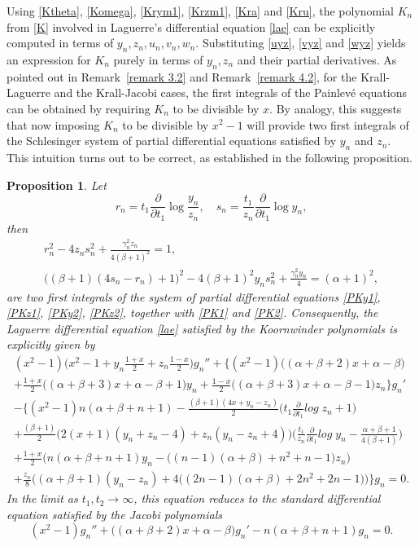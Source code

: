 \documentclass[10pt, reqno]{amsart}
\numberwithin{equation}{section}
\newtheorem{proposition}{Proposition}[section]
\numberwithin{equation}{section}
\begin{document}
Using \eqref{Ktheta}, \eqref{Komega}, \eqref{Krym1}, \eqref{Krzm1}, \eqref{Kra} and \eqref{Kru}, the polynomial $K_n$ from \eqref{K} involved in Laguerre's differential equation \eqref{lae} can be explicitly computed in terms of $y_n,z_n,u_n,v_n,w_n$. Substituting \eqref{uyz}, \eqref{vyz} and \eqref{wyz} yields an expression for $K_n$ purely in terms of  $y_n, z_n$ and their partial derivatives. As pointed out in Remark~\ref{remark 3.2} and Remark~\ref{remark 4.2}, for the Krall-Laguerre and the Krall-Jacobi cases, the first integrals of the Painlevé equations can be obtained by requiring  $K_n$ to be divisible by $x$. By analogy, this suggests that now imposing $K_n$ to be divisible by $x^2-1$ will provide two first integrals of the  Schlesinger system of partial differential equations satisfied by $y_n$ and $z_n$. This intuition turns out to be correct, as established in the following proposition.
\begin{proposition} \label{proposition 5.1}
Let
\begin{equation} 
r_n=t_1\frac{\partial}{\partial t_1} \log\frac{y_n}{z_n},\quad s_n=\frac{t_1}{z_n}\frac{\partial}{\partial t_1}\log y_n,\label{rs}
\end{equation}
then
\begin{gather}
r_n^2-4z_ns_n^2+\frac{\gamma_n^2z_n}{4(\beta+1)^2}=1,\label{SKFI1}\\
\big((\beta+1)(4s_n-r_n)+1\big)^2-4(\beta+1)^2y_ns_n^2+\frac{\gamma_n^2 y_n}{4}=(\alpha+1)^2,\label{SKFI2}
\end{gather} 
are two first integrals of the system of partial differential equations \eqref{PKy1}, \eqref{PKz1}, \eqref{PKy2}, \eqref{PKz2}, together with \eqref{PK1} and \eqref{PK2}. Consequently, the Laguerre differential equation \eqref{lae} satisfied by the Koornwinder polynomials is explicitly given by
\begin{multline}
(x^2-1)\Big(x^2-1+y_n\frac{1+x}{2}+z_n\frac{1-x}{2}\Big)g_n''+\Big\{(x^2-1)\big((\alpha+\beta+2)x+\alpha-\beta\big)\\
+\frac{1+x}{2}\big((\alpha+\beta+3)x+\alpha-\beta+1\big)y_n+\frac{1-x}{2}\big((\alpha+\beta+3)x+\alpha-\beta-1\big)z_n\Big\}g_n'\\
-\Bigg\{(x^2-1)n(\alpha+\beta+n+1)-\frac{(\beta+1)(4x+y_n-z_n)}{2}\Big(t_1\frac{\partial}{\partial t_1} log\;z_n+1\Big)\\
+\frac{(\beta+1)}{2}\Big(2(x+1)(y_n+z_n-4)+z_n(y_n-z_n+4)\Big)\Big(\frac{t_1}{z_n}\frac{\partial}{\partial t_1}log\;y_n-\frac{\alpha+\beta+1}{4(\beta+1)}\Big)\\
+\frac{1+x}{2}\Big(n(\alpha+\beta+n+1)y_n-\big((n-1)(\alpha+\beta)+n^2+n-1\big)z_n\Big)\\
+\frac{z_n}{8}\Big((\alpha+\beta+1)(y_n-z_n)+4\big((2n-1)(\alpha+\beta)+2n^2+2n-1\big)\Big)\Bigg\}g_n=0.\label{Kode}
\end{multline}
In the limit as $t_1, t_2\to \infty$, this equation reduces to the standard differential equation satisfied by the Jacobi polynomials
\begin{equation}
(x^2-1)g_n''+\big((\alpha+\beta+2)x+\alpha-\beta\big)g_n'-n(\alpha+\beta+n+1)g_n=0.\label{Jade}
\end{equation}
\end{proposition}
\end{document}
